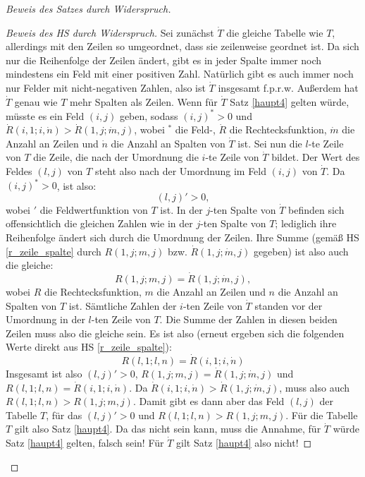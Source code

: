 \begin{proof}[Beweis des Satzes durch Widerspruch]
\begin{proof}[Beweis des HS durch Widerspruch]
        Sei zunächst $\dot T$ die gleiche Tabelle wie $T$, allerdings mit den Zeilen so umgeordnet, dass sie 
        zeilenweise geordnet ist. Da sich nur die Reihenfolge der Zeilen ändert, gibt es in jeder Spalte immer noch 
        mindestens ein Feld mit einer positiven Zahl. Natürlich gibt es auch immer noch nur Felder mit nicht-negativen 
        Zahlen, also ist $\dot T$ insgesamt f.p.r.w. Außerdem hat $\dot T$ genau wie $T$ mehr Spalten als Zeilen. 
        Wenn für $\dot T$ Satz \ref{haupt4} gelten würde, müsste es ein Feld $(i, j)$ geben, sodass $(i, j)^*>0$ 
        und $\dot R(i, 1; i, \dot n) > \dot R(1, j; \dot m, j)$, wobei $^*$ die Feld-, $\dot R$ die Rechtecksfunktion, 
        $\dot m$ die Anzahl an Zeilen und $\dot n$ die Anzahl an Spalten von $\dot T$ ist. Sei nun die $l$-te Zeile 
        von $T$ die Zeile, die nach der Umordnung die $i$-te Zeile von $\dot T$ bildet. Der Wert des Feldes $(l, j)$ 
        von $T$ steht also nach der Umordnung im Feld $(i, j)$ von $\dot T$. Da $(i, j)^*>0$, ist also:
        \[
            (l, j)'>0,
        \]
        wobei $'$ die Feldwertfunktion von $T$ ist. In der $j$-ten Spalte von $\dot T$ befinden sich offensichtlich 
        die gleichen Zahlen wie in der $j$-ten Spalte von $T$; lediglich ihre Reihenfolge ändert sich durch die 
        Umordnung der Zeilen. Ihre Summe (gemäß HS \ref{r_zeile_spalte} durch $R(1, j; m, j)$ bzw. $\dot R(1, j; 
        \dot m, j)$ gegeben) ist also auch die gleiche:
        \[
            R(1, j; m, j)=\dot R(1, j; \dot m, j),
        \]
        wobei $R$ die Rechtecksfunktion, $m$ die Anzahl an Zeilen und $n$ die Anzahl an Spalten von $T$ ist. 
        Sämtliche Zahlen der $i$-ten Zeile von $\dot T$ standen vor der Umordnung in der $l$-ten Zeile von $T$. 
        Die Summe der Zahlen in diesen beiden Zeilen muss also die gleiche sein. Es ist also (erneut ergeben sich die 
        folgenden Werte direkt aus HS \ref{r_zeile_spalte}):
        \[
            R(l, 1; l, n)=\dot R(i, 1; i, \dot n)
        \]
        Insgesamt ist also $(l, j)'>0$, $R(1, j; m, j)=\dot R(1, j; \dot m, j)$ und $R(l, 1; l, n)=\dot R(i, 1; i, 
        \dot n)$. Da $\dot R(i, 1; i, \dot n) > \dot R(1, j; \dot m, j)$, muss also auch $R(l, 1; l, n) > 
        R(1, j; m, j)$. Damit gibt es dann aber das Feld $(l, j)$ der Tabelle $T$, für das $(l, j)'>0$ und $R(l, 
        1; l, n) > R(1, j; m, j)$. Für die Tabelle $T$ gilt also Satz \ref{haupt4}. Da das nicht sein kann, 
        muss die Annahme, für $\dot T$ würde Satz \ref{haupt4} gelten, falsch sein! Für $\dot T$ gilt Satz 
        \ref{haupt4} also nicht!


\end{proof}
\end{proof}
